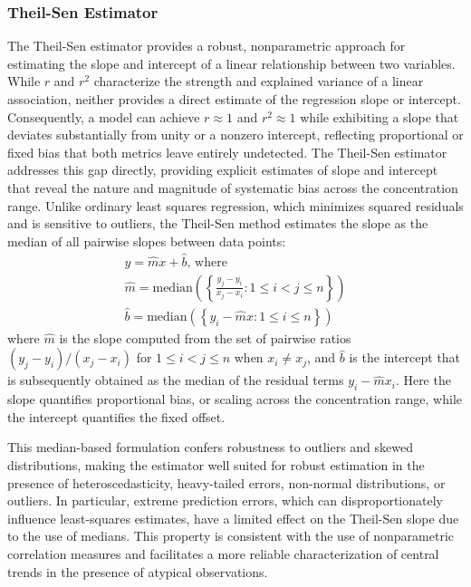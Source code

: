 \subsubsection{Theil-Sen Estimator}
\label{sec:Eval:subsec:RegMetrics:subsubsec:theil-sen}
The Theil-Sen estimator \cite{Theil1950} provides a robust, nonparametric approach for estimating the slope and intercept of a linear relationship between two variables. While $r$ and $r^2$ characterize the strength and explained variance of a linear association, neither provides a direct estimate of the regression slope or intercept. Consequently, a model can achieve $r \approx 1$ and $r^2 \approx 1$ while exhibiting a slope that deviates substantially from unity or a nonzero intercept, reflecting proportional or fixed bias that both metrics leave entirely undetected. The Theil-Sen estimator addresses this gap directly, providing explicit estimates of slope and intercept that reveal the nature and magnitude of systematic bias across the concentration range. Unlike ordinary least squares regression, which minimizes squared residuals and is sensitive to outliers, the Theil-Sen method estimates the slope as the median of all pairwise slopes between data points:
\begin{equation}\label{eqn:theil-sen}
    \begin{gathered}
        y = \hat{m}x + \hat{b}\text{, where}\\[1pt]
        \hat{m} = \text{median}\left(\left\{ \frac{y_j-y_i}{x_j-x_i}:1\leq i < j \leq n \right\}\right)\\[1pt]%
        \hat{b} = \text{median}\left(\left\{ y_i-\hat{m}x: 1\leq i \leq n \right\}\right)
    \end{gathered}
\end{equation}
\noindent where $\hat{m}$ is the slope computed from the set of pairwise ratios $(y_j - y_i)/(x_j - x_i)$ for $1 \leq i < j \leq n$ when $x_i\neq x_j$, and $\hat{b}$ is the intercept that is subsequently obtained as the median of the residual terms $y_i - \hat{m}x_i$. Here the slope quantifies proportional bias, or scaling across the concentration range, while the intercept quantifies the fixed offset. 

This median-based formulation confers robustness to outliers and skewed distributions, making the estimator well suited for robust estimation in the presence of heteroscedasticity, heavy-tailed errors, non-normal distributions, or outliers. In particular, extreme prediction errors, which can disproportionately influence least-squares estimates, have a limited effect on the Theil-Sen slope due to the use of medians. This property is consistent with the use of nonparametric correlation measures and facilitates a more reliable characterization of central trends in the presence of atypical observations.

